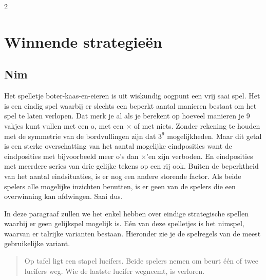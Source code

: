 \begin{multicols}{2}


    

\section{Winnende strategieën}\label{sec:winningstrat}
\subsection*{Nim}
Het spelletje boter-kaas-en-eieren is uit wiskundig oogpunt een vrij saai spel. Het is een eindig spel waarbij er slechts een beperkt aantal manieren bestaat om het spel te laten verlopen. Dat merk je al als je berekent op hoeveel manieren je 9 vakjes kunt vullen met een o, met een $\times$ of met niets. Zonder rekening te houden met de symmetrie van de  bordvullingen zijn dat $3^9$ mogelijkheden. Maar dit getal is een sterke overschatting van het aantal mogelijke eindposities want de eindposities met bijvoorbeeld meer o's dan $\times$'en zijn verboden. En eindposities met meerdere series van drie gelijke tekens op een rij ook. Buiten de beperktheid van het aantal eindsituaties, is er nog een andere storende factor. Als beide spelers alle mogelijke inzichten benutten, is er geen van de spelers die een overwinning kan afdwingen. Saai dus. 

In deze paragraaf zullen we het enkel hebben over eindige strategische spellen waarbij er geen gelijkspel mogelijk is. Eén van deze spelletjes is het nimspel, waarvan er talrijke varianten bestaan. Hieronder zie je de spelregels van de meest gebruikelijke variant.

\begin{quote}
    Op tafel ligt een stapel lucifers. Beide spelers nemen om beurt één of twee lucifers weg. Wie de laatste lucifer wegneemt, is verloren.
\end{quote}


\end{multicols}
